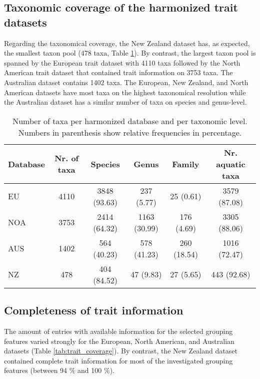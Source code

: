\documentclass[../Draft_harmonization_paper.tex]{subfiles}
\begin{document}
\subsection*{Taxonomic coverage of the harmonized trait datasets}

Regarding the taxonomical coverage, the New Zealand dataset has, as expected, the smallest taxon pool (478 taxa, Table \ref{tab:tax_coverage}). By contrast, the largest taxon pool is spanned by the European trait dataset with 4110 taxa followed by the North American trait dataset that contained trait information on 3753 taxa. The Australian dataset contains 1402 taxa. The European, New Zealand, and North American datasets have most taxa on the highest taxonomical resolution while the Australian dataset has a similar number of taxa on species and genus-level.

\begin{table}[ht]
    \centering
    \caption{Number of taxa per harmonized database and per taxonomic level. Numbers in parenthesis show relative frequencies in percentage.}
    \label{tab:tax_coverage}
    \begin{tabular}{lccccc}
    \\
    Database & Nr. of taxa & Species & Genus & Family & Nr. aquatic taxa \\ 
    \toprule[.1em]
    EU & 4110 & 3848 (93.63) & 237 (5.77) & 25 (0.61) & 3579 (87.08) \\ 
    NOA & 3753 & 2414 (64.32) & 1163 (30.99) & 176 (4.69) & 3305 (88.06) \\ 
    AUS & 1402 & 564 (40.23) & 578 (41.23) & 260 (18.54) & 1016 (72.47) \\ 
    NZ & 478 & 404 (84.52) & 47 (9.83) & 27 (5.65) & 443 (92.68) \\ 
    \bottomrule
    \end{tabular}
\end{table}


\subsection*{Completeness of trait information}

The amount of entries with available information for the selected grouping features varied strongly for the European, North American, and Australian datasets (Table \ref{tab:trait_coverage}). By contrast, the New Zealand dataset contained complete trait information for most of the investigated grouping features (between 94 \% and 100 \%).
\end{document}
